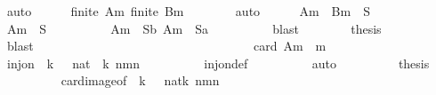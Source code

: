 \begin{isabellebody}
\ auto\isanewline
\isanewline
\ \ \ \ \isamarkupfalse%
\ {\isachardoublequoteopen}finite\ {\isacharquery}Am{\isachardoublequoteclose}\ {\isachardoublequoteopen}finite\ {\isacharquery}Bm{\isachardoublequoteclose}\isanewline
\ \ \ \ \ \ \isamarkupfalse%
\ auto\isanewline
\isanewline
\ \ \ \ \isamarkupfalse%
\ {\isachardoublequoteopen}{\isacharquery}Am\ {\isasymunion}\ {\isacharquery}Bm\ {\isacharequal}\ {\isacharquery}S{\isachardoublequoteclose}\isanewline
\ \ \ \ \isamarkupfalse%
{\isacharminus}\isanewline
\ \ \ \ \ \ \isamarkupfalse%
\ {\isachardoublequoteopen}{\isacharquery}Am\ {\isasymsubseteq}\ {\isacharquery}S{\isachardoublequoteclose}\isanewline
\ \ \ \ \ \ \ \ \isamarkupfalse%
\ {\isacharbackquoteopen}{\isacharquery}Am{\isacharprime}\ {\isasymsubseteq}\ {\isacharquery}Sb{\isacharbackquoteclose}\ {\isacharbackquoteopen}{\isacharquery}Am{\isacharprime}{\isacharprime}\ {\isasymsubseteq}\ {\isacharquery}Sa{\isacharbackquoteclose}\isanewline
\ \ \ \ \ \ \ \ \isamarkupfalse%
\ blast\isanewline
\ \ \ \ \ \ \isamarkupfalse%
\ {\isacharquery}thesis\isanewline
\ \ \ \ \ \ \ \ \isamarkupfalse%
\ blast\isanewline
\ \ \ \ \isamarkupfalse%
\isanewline
\ \ \ \ \ \ \ \ \ \ \ \ \ \ \ \ \ \ \ \isanewline
\ \ \ \ \isamarkupfalse%
\isanewline
\isanewline
\ \ \ \ \isamarkupfalse%
\ {\isachardoublequoteopen}card\ {\isacharquery}Am\ {\isacharequal}\ m{\isachardoublequoteclose}\isanewline
\ \ \ \ \isamarkupfalse%
{\isacharminus}\isanewline
\ \ \ \ \ \ \isamarkupfalse%
\ {\isachardoublequoteopen}inj{\isacharunderscore}on\ {\isacharparenleft}{\isasymlambda}\ k{\isachardot}\ {}\ {\isacharasterisk}\ {\isacharparenleft}{}{\isacharcolon}{\isacharcolon}nat{\isacharparenright}\ {\isacharcircum}\ k{\isacharparenright}\ {\isacharbraceleft}n{\isacharminus}m{\isacharplus}{}{\isachardot}{\isachardot}{\isacharless}n{\isacharbraceright}{\isachardoublequoteclose}\isanewline
\ \ \ \ \ \ \ \ \isamarkupfalse%
\ inj{\isacharunderscore}on{\isacharunderscore}def\isanewline
\ \ \ \ \ \ \ \ \isamarkupfalse%
\ auto\isanewline
\ \ \ \ \ \ \isamarkupfalse%
\ \isamarkupfalse%
\ {\isacharquery}thesis\isanewline
\ \ \ \ \ \ \ \ \isamarkupfalse%
\ card{\isacharunderscore}image{\isacharbrackleft}of\ {\isachardoublequoteopen}{\isasymlambda}\ k{\isachardot}\ {}\ {\isacharasterisk}\ {\isacharparenleft}{}{\isacharcolon}{\isacharcolon}nat{\isacharparenright}{\isacharcircum}k{\isachardoublequoteclose}\ {\isachardoublequoteopen}{\isacharbraceleft}n{\isacharminus}m{\isacharplus}{}{\isachardot}{\isachardot}{\isacharless}n{\isacharbraceright}{\isachardoublequoteclose}{\isacharbrackright}\ \isanewline

\end{isabellebody}
